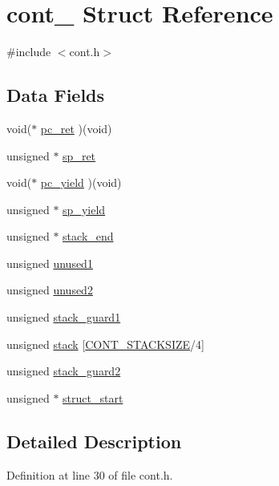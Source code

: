 \hypertarget{structcont__}{}\section{cont\+\_\+ Struct Reference}
\label{structcont__}


{\ttfamily \#include $<$cont.\+h$>$}

\subsection*{Data Fields}
\begin{DoxyCompactItemize}
\item 
void($\ast$ \hyperlink{structcont___a629ed7b6bf785c9027c7fc9eaac32f6e}{pc\+\_\+ret} )(void)
\item 
unsigned $\ast$ \hyperlink{structcont___a2f886d4182bed43aaf66d3a55a2d23b7}{sp\+\_\+ret}
\item 
void($\ast$ \hyperlink{structcont___af0d518438302b7f8629c06c85f5c41ae}{pc\+\_\+yield} )(void)
\item 
unsigned $\ast$ \hyperlink{structcont___a59ce8d64c25ff1d02ae24c61080bbf7c}{sp\+\_\+yield}
\item 
unsigned $\ast$ \hyperlink{structcont___ab6e542a519497e515e2d3a62030a1f61}{stack\+\_\+end}
\item 
unsigned \hyperlink{structcont___ab61b08c26f5251cdb06e9b2173da911f}{unused1}
\item 
unsigned \hyperlink{structcont___a4571d78e98dbcf7547ea1dc49c7b7a58}{unused2}
\item 
unsigned \hyperlink{structcont___a17c9f5d8bc954cc0381bdbe63d350048}{stack\+\_\+guard1}
\item 
unsigned \hyperlink{structcont___abc9f985ead0aa2c6795818c0bce6f9c1}{stack} \mbox{[}\hyperlink{user__task_8c_a3c0457d493868f331ce63d0ef71aeb3e}{C\+O\+N\+T\+\_\+\+S\+T\+A\+C\+K\+S\+I\+ZE}/4\mbox{]}
\item 
unsigned \hyperlink{structcont___af9e24c89ac69a95ae78a6c7f8a237da0}{stack\+\_\+guard2}
\item 
unsigned $\ast$ \hyperlink{structcont___aa75475b47ca0d3a4a691651402c94fa3}{struct\+\_\+start}
\end{DoxyCompactItemize}


\subsection{Detailed Description}


Definition at line 30 of file cont.\+h.



